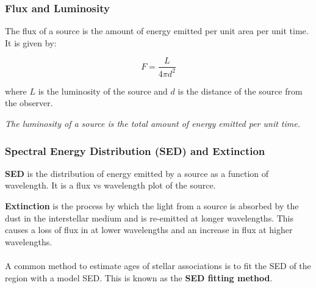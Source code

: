 \documentclass{beamer}
\begin{document}
\begin{frame}
    \frametitle{Flux and Luminosity}

    The flux of a source is the amount of energy emitted per unit area per unit time. It is given by:

    \begin{equation}
        F = \frac{L}{4\pi d^2}
    \end{equation}

    where $L$ is the luminosity of the source and $d$ is the distance of the source from the observer.

    \textit{The luminosity of a source is the total amount of energy emitted per unit time.}
\end{frame}

\begin{frame}
    \frametitle{Spectral Energy Distribution (SED) and Extinction}

    \textbf{SED} is the distribution of energy emitted by a source as a function of wavelength. It is a flux vs wavelength plot of the source.

    \textbf{Extinction} is the process by which the light from a source is absorbed by the dust in the interstellar medium and is re-emitted at longer wavelengths. This causes a loss of flux in at lower wavelengths and an increase in flux at higher wavelengths.
    \\~\\
    A common method to estimate ages of stellar associations is to fit the SED of the region with a model SED. This is known as the \textbf{SED fitting method}.

\end{frame}
\end{document}
